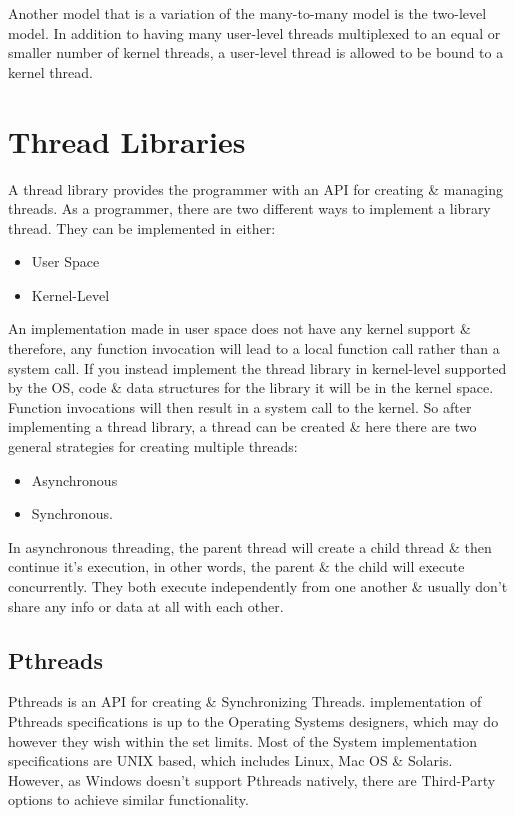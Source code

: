 \documentclass[a4paper,11pt]{article}
\begin{document}
Another model that is a variation of the many-to-many model is the two-level model. In addition to having many user-level threads multiplexed to an equal or smaller number of kernel threads, a user-level thread is allowed to be bound to a kernel thread. 
\newpage\section{Thread Libraries}
A thread library provides the programmer with an API for creating \& managing threads. As a programmer, there are two different ways to implement a library thread. They can be implemented in either:
\begin{itemize}
    \item User Space
    \item Kernel-Level
\end{itemize}
An implementation made in user space does not have any kernel support \& therefore, any function invocation will lead to a local function call rather than a system call.\cite{Operatingsystemconcepts} 
\newline\indent If you instead implement the thread library in kernel-level supported by the OS, code \& data structures for the library it will be in the kernel space. Function invocations will then result in a system call to the kernel. So after implementing a thread library, a thread can be created \& here there are two general strategies for creating multiple threads: 
\begin{itemize}
    \item Asynchronous
    \item Synchronous.
\end{itemize}
In asynchronous threading, the parent thread will create a child thread \& then continue it’s execution, in other words, the parent \& the child will execute concurrently. They both execute independently from one another \& usually don’t share any info or data at all with each other.\cite{Operatingsystemconcepts}
\subsection{Pthreads}
Pthreads is an API for creating \& Synchronizing Threads. implementation of Pthreads specifications is up to the Operating Systems designers, which may do however they wish within the set limits. Most of the System implementation specifications are UNIX based, which includes Linux, Mac OS \& Solaris. However, as Windows doesn't support Pthreads natively, there are Third-Party options to achieve similar functionality.\cite{Operatingsystemconcepts}
\end{document}
